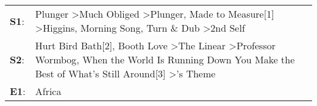 \begin{supertabular}{p{0.03\textwidth}p{0.92\textwidth}}
 \textbf{S1}:  &  Plunger\textsuperscript{} \textgreater \enspace Much Obliged\textsuperscript{} \textgreater \enspace Plunger\textsuperscript{}, \enspace Made to Measure[1]\textsuperscript{} \textgreater \enspace Higgins\textsuperscript{}, \enspace Morning Song\textsuperscript{}, \enspace Turn \& Dub\textsuperscript{} \textgreater \enspace 2nd Self\textsuperscript{}  \enspace  \\
 \textbf{S2}:  &                Hurt Bird Bath[2]\textsuperscript{}, \enspace Booth Love\textsuperscript{} \textgreater \enspace The Linear\textsuperscript{} \textgreater \enspace Professor Wormbog\textsuperscript{}, \enspace When the World Is Running Down You Make the Best of What's Still Around[3]\textsuperscript{} \textgreater {}'s Theme\textsuperscript{}  \enspace  \\
 \textbf{E1}:  &                                                                                                                                                                                                                                                                                                                                         Africa\textsuperscript{}  \enspace  \\
\end{supertabular}
